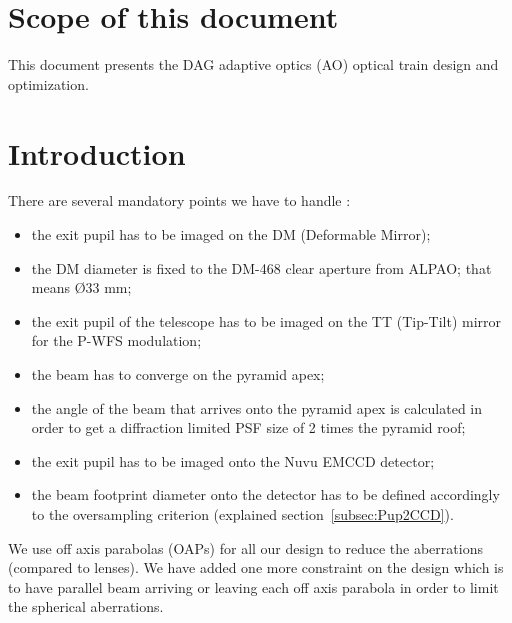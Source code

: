 \documentclass[12pt,a4paper]{article}
\begin{document}
\section{Scope of this document}

This document presents the DAG adaptive optics (AO) optical train design and optimization.

\section{Introduction}
There are several mandatory points we have to handle :
\begin{itemize}
	\item the exit pupil has to be imaged on the DM (Deformable Mirror);
	\item the DM diameter is fixed to the DM-468 clear aperture from ALPAO; that means \O $33$ mm;
	\item the exit pupil of the telescope has to be imaged on the TT (Tip-Tilt) mirror for the P-WFS modulation;
	\item the beam has to converge on the pyramid apex;
	\item the angle of the beam that arrives onto the pyramid apex is calculated in order to get a diffraction limited PSF size of 2 times the pyramid roof;
	\item the exit pupil has to be imaged onto the Nuvu EMCCD detector;
	\item the beam footprint diameter onto the detector has to be defined accordingly to the oversampling criterion (explained section~\ref{subsec:Pup2CCD}).\\
\end{itemize}

We use off axis parabolas (OAPs) for all our design to reduce the aberrations (compared to lenses).
We have added one more constraint on the design which is to have parallel beam arriving or leaving each off axis parabola in order to limit the spherical aberrations.\\
\end{document}
